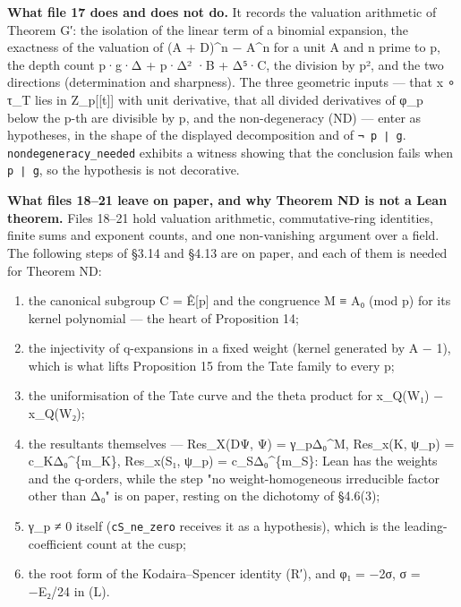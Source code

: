 \documentclass[11pt,a4paper]{article}
\theoremstyle{named}
\begin{document}
\textbf{What file 17 does and does not do.} It records the valuation arithmetic of Theorem G′: the isolation of the linear term of a binomial expansion, the exactness of the valuation of (A + D)\textasciicircum{}n − A\textasciicircum{}n for a unit A and n prime to p, the depth count p·g·Δ + p·Δ² ·B + Δ⁵·C, the division by p², and the two directions (determination and sharpness). The three geometric inputs — that x ∘ τ\_T lies in Z\_p[[t]] with unit derivative, that all divided derivatives of φ\_p below the p-th are divisible by p, and the non-degeneracy (ND) — enter as hypotheses, in the shape of the displayed decomposition and of \texttt{¬\ \allowbreak{}p\ \allowbreak{}∣\ \allowbreak{}g}. \texttt{nondegeneracy\_\allowbreak{}needed} exhibits a witness showing that the conclusion fails when \texttt{p\ \allowbreak{}∣\ \allowbreak{}g}, so the hypothesis is not decorative.

\textbf{What files 18–21 leave on paper, and why Theorem ND is not a Lean theorem.} Files 18–21 hold valuation arithmetic, commutative-ring identities, finite sums and exponent counts, and one non-vanishing argument over a field. The following steps of §3.14 and §4.13 are on paper, and each of them is needed for Theorem ND:

\begin{enumerate}[leftmargin=1.4em,itemsep=.2em,topsep=.3em]
\item the canonical subgroup C = Ê[p] and the congruence M ≡ A₀ (mod p) for its kernel polynomial — the heart of Proposition 14;
\item the injectivity of q-expansions in a fixed weight (kernel generated by A − 1), which is what lifts Proposition 15 from the Tate family to every p;
\item the uniformisation of the Tate curve and the theta product for x\_Q(W₁) − x\_Q(W₂);
\item the resultants themselves — Res\_X(DΨ, Ψ) = γ\_pΔ₀\textasciicircum{}M, Res\_x(K, ψ\_p) = c\_KΔ₀\textasciicircum{}\{m\_K\}, Res\_x(S₁, ψ\_p) = c\_SΔ₀\textasciicircum{}\{m\_S\}: Lean has the weights and the q-orders, while the step "no weight-homogeneous irreducible factor other than Δ₀" is on paper, resting on the dichotomy of §4.6(3);
\item γ\_p ≠ 0 itself (\texttt{cS\_\allowbreak{}ne\_\allowbreak{}zero} receives it as a hypothesis), which is the leading-coefficient count at the cusp;
\item the root form of the Kodaira–Spencer identity (R′), and φ₁ = −2σ, σ = −E₂/24 in (L).
\end{enumerate}
\end{document}
